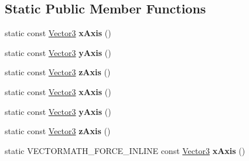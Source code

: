 \subsection*{Static Public Member Functions}
\begin{DoxyCompactItemize}
\item 
\mbox{\label{classVectormath_1_1Aos_1_1Vector3_ad2c5a19c52b39f4e8ba6e9a5ee21e5d0}} 
static const \hyperlink{classVectormath_1_1Aos_1_1Vector3}{Vector3} {\bfseries x\+Axis} ()
\item 
\mbox{\label{classVectormath_1_1Aos_1_1Vector3_a82fec2cfd5afda33400e288ea8e1c73d}} 
static const \hyperlink{classVectormath_1_1Aos_1_1Vector3}{Vector3} {\bfseries y\+Axis} ()
\item 
\mbox{\label{classVectormath_1_1Aos_1_1Vector3_a0524b99b228733196b3156ad6d32cd61}} 
static const \hyperlink{classVectormath_1_1Aos_1_1Vector3}{Vector3} {\bfseries z\+Axis} ()
\item 
\mbox{\label{classVectormath_1_1Aos_1_1Vector3_adb14735bfe8dfe9a47d40101df2d6bac}} 
static const \hyperlink{classVectormath_1_1Aos_1_1Vector3}{Vector3} {\bfseries x\+Axis} ()
\item 
\mbox{\label{classVectormath_1_1Aos_1_1Vector3_a294d0afafac74a08da052b0634933c8d}} 
static const \hyperlink{classVectormath_1_1Aos_1_1Vector3}{Vector3} {\bfseries y\+Axis} ()
\item 
\mbox{\label{classVectormath_1_1Aos_1_1Vector3_adb1dcbe829b75d5a1b6e57e7dc283394}} 
static const \hyperlink{classVectormath_1_1Aos_1_1Vector3}{Vector3} {\bfseries z\+Axis} ()
\item 
\mbox{\label{classVectormath_1_1Aos_1_1Vector3_ad0e9d557df8c430a702cc2358c6f7014}} 
static V\+E\+C\+T\+O\+R\+M\+A\+T\+H\+\_\+\+F\+O\+R\+C\+E\+\_\+\+I\+N\+L\+I\+NE const \hyperlink{classVectormath_1_1Aos_1_1Vector3}{Vector3} {\bfseries x\+Axis} ()
\item 
\mbox{\label{classVectormath_1_1Aos_1_1Vector3_a09dcdf16938b37751a0a8df7f31e6b72}} 

\end{DoxyCompactItemize}
